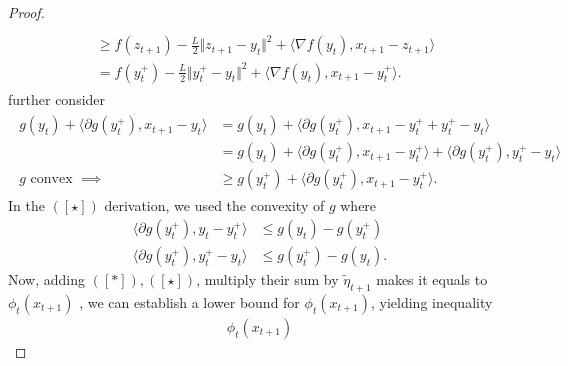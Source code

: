 \documentclass[12pt]{article}
\begin{document}
\begin{proof}
\begin{align*}
\begin{aligned}
                    \\
                    &\ge 
                    f(z_{t + 1}) - \frac{L}{2} \Vert z_{t + 1} - y_t\Vert^2 + 
                    \langle \nabla f(y_t), x_{t +1} - z_{t + 1}\rangle
                    \\
                    &= 
                    f(y_t^+) - \frac{L}{2}\Vert y_t^+ - y_t\Vert^2
                    + \langle \nabla f(y_t), x_{t + 1} - y_t^+\rangle.     
                \end{aligned}
                \tag{$[*]$}
            \end{align*}
            further consider
            \begin{align*}
                \begin{aligned}
                    g(y_t) + \langle \partial g(y_t^+), x_{t + 1} - y_t\rangle 
                    &= g(y_t) + 
                    \langle \partial g(y_t^+), 
                    x_{t + 1} - y_t^+ + y_t^+ - y_t
                    \rangle
                    \\
                    &= g(y_t) 
                    + \langle \partial g (y_t^+),
                        x_{t + 1} - y_t^+
                    \rangle
                    + 
                    \langle 
                        \partial g(y_t^+), y_t^+ - y_t
                    \rangle
                    \\
                    g \text{ convex }\implies 
                    &\ge 
                    g(y_t^+) + 
                    \langle \partial g(y_t^+), x_{t + 1} - y_t^+\rangle. 
                \end{aligned}
                \tag{$[\star]$}
            \end{align*}
            In the $([\star])$ derivation, we used the convexity of $g$ where 
            \begin{align*}
                \langle \partial g(y_t^+), y_t - y_t^+\rangle
                &\le g(y_t) - g(y_t^+)
                \\
                \langle \partial g (y_t^+), y_t^+ - y_t \rangle
                &\le 
                g(y_t^+) - g(y_t). 
            \end{align*}
            Now, adding $([*]), ([\star])$, multiply their sum by $\tilde\eta_{t + 1}$ makes it equals to $\phi_t(x_{t +1 })$ , we can establish a lower bound for $\phi_t(x_{t + 1})$, yielding inequality 
            {\small
                \begin{align*}
                    \phi_t(x_{t + 1})

\end{align*}}
\end{proof}
\end{document}
